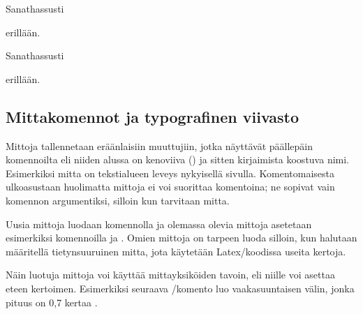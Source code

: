 \pagebreak[3]

\begin{koodilohkosis}
  Sanat\hspace{1.2cm}hassusti
  \vspace{2mm}

  \hspace{1.75em}erillään.
\end{koodilohkosis}

\begin{tulossis}
  Sanat\hspace{1.2cm}hassusti  \nopagebreak
  \vspace{2mm}

  \hspace{1.75em}erillään.
\end{tulossis}

\subsection{Mittakomennot ja typografinen viivasto}

Mittoja tallennetaan eräänlaisiin muuttujiin, jotka näyttävät päällepäin
komennoilta eli niiden alussa on kenoviiva (\koodi{\keno}) ja sitten
kirjaimista koostuva nimi. Esimerkiksi mitta 
on teks\-ti\-alueen leveys nykyisellä sivulla. Komentomaisesta
ulko\-asus\-taan huolimatta mittoja ei voi suorittaa komentoina; ne
sopivat vain komennon argumentiksi, silloin kun tarvitaan mitta.

Uusia mittoja luodaan komennolla  ja olemassa
olevia mittoja asetetaan esimerkiksi komennoilla  ja . Omien mittoja on
tarpeen luoda silloin, kun halutaan määritellä tietynsuuruinen mitta,
jota käytetään Latex\-/koodissa useita kertoja.

\begin{koodilohkosis}
  \newlength{\omamitta}         %
  \setlength{\omamitta}{2.3em}  %
  \addtolength{\omamitta}{1em}  %
  \addtolength{\omamitta}{-1em} %
\end{koodilohkosis}

Näin luotuja mittoja voi käyttää mittayksiköiden tavoin, eli niille voi
asettaa eteen kertoimen. Esimerkiksi seuraava \-/komento luo vaakasuuntaisen välin, jonka pituus on 0,7
kertaa .

\begin{koodilohkosis}
  \hspace{0.7\omamitta}
\end{koodilohkosis}

